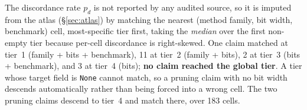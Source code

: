 The discordance rate $p_d$ is not reported by any audited source, so it is
imputed from the atlas (\S\ref{sec:atlas}) by matching the nearest (method
family, bit width, benchmark) cell, most-specific tier first, taking the
\emph{median} over the first non-empty tier because per-cell discordance is
right-skewed. One claim matched at tier~1 (family + bits + benchmark), 11 at
tier~2 (family + bits), 2 at tier~3 (bits + benchmark), and 3 at tier~4 (bits);
\textbf{no claim reached the global tier}. A tier whose target field is
\texttt{None} cannot match, so a pruning claim with no bit width descends
automatically rather than being forced into a wrong cell. The two pruning claims
descend to tier~4 and match there, over 183 cells.

